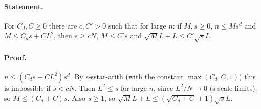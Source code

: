 \paragraph{Statement.} For $C_d,C\geq0$ there are $c,C'>0$ such that for large $n$: if $M,s\geq0$, $n\leq Ms^d$ and $M\leq C_ds+CL^2$, then
$s\geq cN$, $M\leq C's$ and $\sqrt ML+L\leq C'\sqrt sL$.
\paragraph{Proof.} $n\leq(C_ds+CL^2)s^d$. By s-sstar-arith (with the constant $\max(C_d,C,1)$) this is impossible if $s<cN$. Then $L^2\leq s$ for large $n$,
since $L^2/N\to0$ (s-scale-limits); so $M\leq(C_d+C)s$. Also $s\geq1$, so $\sqrt ML+L\leq(\sqrt{C_d+C}+1)\sqrt sL$.
